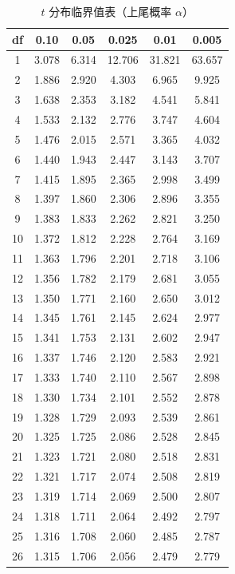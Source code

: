 \documentclass[lang=cn,10pt]{elegantbook}
\begin{document}
\begin{table}[H]
  \centering
  \caption{$t$ 分布临界值表（上尾概率 $\alpha$）}
  \small
  \begin{tabular}{c|ccccc}
    \toprule
    df & 0.10 & 0.05 & 0.025 & 0.01 & 0.005 \\
    \midrule
    1 & 3.078 & 6.314 & 12.706 & 31.821 & 63.657 \\
    2 & 1.886 & 2.920 & 4.303 & 6.965 & 9.925 \\
    3 & 1.638 & 2.353 & 3.182 & 4.541 & 5.841 \\
    4 & 1.533 & 2.132 & 2.776 & 3.747 & 4.604 \\
    5 & 1.476 & 2.015 & 2.571 & 3.365 & 4.032 \\
    6 & 1.440 & 1.943 & 2.447 & 3.143 & 3.707 \\
    7 & 1.415 & 1.895 & 2.365 & 2.998 & 3.499 \\
    8 & 1.397 & 1.860 & 2.306 & 2.896 & 3.355 \\
    9 & 1.383 & 1.833 & 2.262 & 2.821 & 3.250 \\
    10 & 1.372 & 1.812 & 2.228 & 2.764 & 3.169 \\
    11 & 1.363 & 1.796 & 2.201 & 2.718 & 3.106 \\
    12 & 1.356 & 1.782 & 2.179 & 2.681 & 3.055 \\
    13 & 1.350 & 1.771 & 2.160 & 2.650 & 3.012 \\
    14 & 1.345 & 1.761 & 2.145 & 2.624 & 2.977 \\
    15 & 1.341 & 1.753 & 2.131 & 2.602 & 2.947 \\
    16 & 1.337 & 1.746 & 2.120 & 2.583 & 2.921 \\
    17 & 1.333 & 1.740 & 2.110 & 2.567 & 2.898 \\
    18 & 1.330 & 1.734 & 2.101 & 2.552 & 2.878 \\
    19 & 1.328 & 1.729 & 2.093 & 2.539 & 2.861 \\
    20 & 1.325 & 1.725 & 2.086 & 2.528 & 2.845 \\
    21 & 1.323 & 1.721 & 2.080 & 2.518 & 2.831 \\
    22 & 1.321 & 1.717 & 2.074 & 2.508 & 2.819 \\
    23 & 1.319 & 1.714 & 2.069 & 2.500 & 2.807 \\
    24 & 1.318 & 1.711 & 2.064 & 2.492 & 2.797 \\
    25 & 1.316 & 1.708 & 2.060 & 2.485 & 2.787 \\
    26 & 1.315 & 1.706 & 2.056 & 2.479 & 2.779 \\

\end{tabular}
\end{table}
\end{document}
